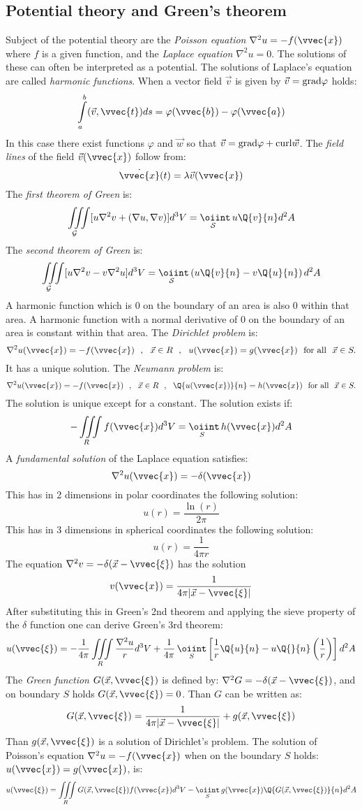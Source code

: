\subsection{Potential theory and Green's theorem}
Subject of the potential theory are the {\it Poisson equation}
$\nabla^2u=-f(\vvec{x})$ where $f$ is a given function, and the {\it Laplace
equation} $\nabla^2u=0$. The solutions of these can often be interpreted as
a potential. The solutions of Laplace's equation are called {\it harmonic
functions}.
\npar
When a vector field $\vec{v}$ is given by $\vec{v}={\rm grad}\varphi$
holds:
\[
\int\limits_a^b(\vec{v},\vvec{t})ds=\varphi(\vvec{b})-\varphi(\vvec{a})
\]
In this case there exist functions $\varphi$ and $\vec{w}$ so that
$\vec{v}={\rm grad}\varphi+{\rm curl}\vec{w}$.
\npar
The {\it field lines} of the field $\vec{v}(\vvec{x})$ follow from:
\[
\dot{\vvec{x}}(t)=\lambda\vec{v}(\vvec{x})
\]
The {\it first theorem of Green} is:
\[
\iiint\limits_{\cal\!\!\! G}[u\nabla^2v+(\nabla u,\nabla v)]d^3V=\mathop{\oiint}\limits_{\cal\!\!\! S}u\Q{v}{n}d^2A
\]
The {\it second theorem of Green} is:
\[
\iiint\limits_{\cal\!\!\! G}[u\nabla^2v-v\nabla^2u]d^3V=\mathop{\oiint}\limits_{\cal\!\!\! S}\left(u\Q{v}{n}-v\Q{u}{n}\right)d^2A
\]
A harmonic function which is 0 on the boundary of an area is also 0 within that
area. A harmonic function with a normal derivative of 0 on the boundary of an
area is constant within that area.
\npar
The {\it Dirichlet problem} is:
\[
\nabla^2u(\vvec{x})=-f(\vvec{x})~~,~~\vec{x}\in R~~,~~u(\vvec{x})=g(\vvec{x})~~\mbox{for all}~~\vec{x}\in S.
\]
It has a unique solution.
\npar
The {\it Neumann problem} is:
\[
\nabla^2u(\vvec{x})=-f(\vvec{x})~~,~~\vec{x}\in R~~,~~\Q{u(\vvec{x})}{n}=h(\vvec{x})~~\mbox{for all}~~\vec{x}\in S.
\]
The solution is unique except for a constant. The solution exists if:
\[
-\iiint\limits_{\!\!\!R}f(\vvec{x})d^3V=\mathop{\oiint}_{\!\!\!S}h(\vvec{x})d^2A
\]
A {\it fundamental solution} of the Laplace equation satisfies:
\[
\nabla^2u(\vvec{x})=-\delta(\vvec{x})
\]
This has in 2 dimensions in polar coordinates the following solution:
\[
u(r)=\frac{\ln(r)}{2\pi}
\]
This has in 3 dimensions in spherical coordinates the following solution:
\[
u(r)=\frac{1}{4\pi r}
\]
The equation $\nabla^2v=-\delta(\vec{x}-\vvec{\xi})$ has the solution
\[
v(\vvec{x})=\frac{1}{4\pi|\vec{x}-\vvec{\xi}|}
\]
After substituting this in Green's 2nd theorem and applying the sieve
property of the $\delta$ function one can derive Green's 3rd theorem:
\[
u(\vvec{\xi})=-\frac{1}{4\pi}\iiint\limits_R\frac{\nabla^2u}{r}d^3V+
\frac{1}{4\pi}\mathop{\oiint}\limits_S\left[\frac{1}{r}\Q{u}{n}-u\Q{}{n}\left(\frac{1}{r}\right)\right]d^2A
\]
The {\it Green function} $G(\vec{x},\vvec{\xi})$ is defined by:
$\nabla^2G=-\delta(\vec{x}-\vvec{\xi})$, and on boundary $S$ holds
$G(\vec{x},\vvec{\xi})=0$. Than $G$ can be written as:
\[
G(\vec{x},\vvec{\xi})=\frac{1}{4\pi|\vec{x}-\vvec{\xi}|}+g(\vec{x},\vvec{\xi})
\]
Than $g(\vec{x},\vvec{\xi})$ is a solution of Dirichlet's problem. The solution
of Poisson's equation $\nabla^2u=-f(\vvec{x})$ when on the boundary $S$ holds:
$u(\vvec{x})=g(\vvec{x})$, is:
\[
u(\vvec{\xi})=\iiint\limits_RG(\vec{x},\vvec{\xi})f(\vvec{x})d^3V-
\mathop{\oiint}\limits_Sg(\vvec{x})\Q{G(\vec{x},\vvec{\xi})}{n}d^2A
\]



